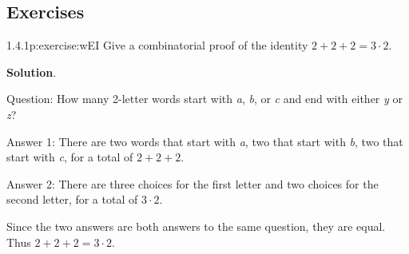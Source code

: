 \documentclass[twoside,11pt,]{book}
\newcommand{\blocktitlefont}{\relax}
\numberwithin{equation}{chapter}
\begin{document}
\subsection*{Exercises}
\begin{divisionsolution}{1.4.1}{}{p:exercise:wEI}%
Give a combinatorial proof of the identity \(2+2+2 = 3\cdot 2\).%
\par\smallskip%
\noindent\textbf{\blocktitlefont Solution}.\quad{}\begin{solutionproof}
Question: How many 2-letter words start with \emph{a}, \emph{b}, or \emph{c} and end with either \emph{y} or \emph{z}?%
\par
Answer 1: There are two words that start with \emph{a}, two that start with \emph{b}, two that start with \emph{c}, for a total of \(2+2+2\).%
\par
Answer 2: There are three choices for the first letter and two choices for the second letter, for a total of \(3 \cdot 2\).%
\par
Since the two answers are both answers to the same question, they are equal. Thus \(2 + 2 + 2 = 3\cdot 2\).%
\end{solutionproof}
\end{divisionsolution}%
\end{document}
